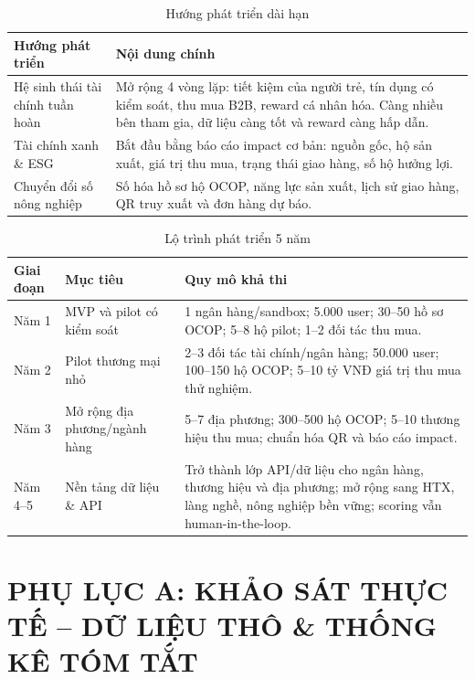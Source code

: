 \documentclass[13pt,a4paper]{extarticle}
\begin{document}
\begin{table}[H]
\centering
\caption{Hướng phát triển dài hạn}
\begin{tabular}{|p{4cm}|p{9cm}|}
\hline
\textbf{Hướng phát triển} & \textbf{Nội dung chính} \\
\hline
Hệ sinh thái tài chính tuần hoàn & Mở rộng 4 vòng lặp: tiết kiệm của người trẻ, tín dụng có kiểm soát, thu mua B2B, reward cá nhân hóa. Càng nhiều bên tham gia, dữ liệu càng tốt và reward càng hấp dẫn. \\
\hline
Tài chính xanh \& ESG & Bắt đầu bằng báo cáo impact cơ bản: nguồn gốc, hộ sản xuất, giá trị thu mua, trạng thái giao hàng, số hộ hưởng lợi. \\
\hline
Chuyển đổi số nông nghiệp & Số hóa hồ sơ hộ OCOP, năng lực sản xuất, lịch sử giao hàng, QR truy xuất và đơn hàng dự báo. \\
\hline
\end{tabular}
\end{table}


\begin{table}[H]
\centering
\caption{Lộ trình phát triển 5 năm}
\begin{tabular}{|p{2cm}|p{4.5cm}|p{7cm}|}
\hline
\textbf{Giai đoạn} & \textbf{Mục tiêu} & \textbf{Quy mô khả thi} \\
\hline
Năm 1 & MVP và pilot có kiểm soát & 1 ngân hàng/sandbox; 5.000 user; 30--50 hồ sơ OCOP; 5--8 hộ pilot; 1--2 đối tác thu mua. \\
\hline
Năm 2 & Pilot thương mại nhỏ & 2--3 đối tác tài chính/ngân hàng; 50.000 user; 100--150 hộ OCOP; 5--10 tỷ VNĐ giá trị thu mua thử nghiệm. \\
\hline
Năm 3 & Mở rộng địa phương/ngành hàng & 5--7 địa phương; 300--500 hộ OCOP; 5--10 thương hiệu thu mua; chuẩn hóa QR và báo cáo impact. \\
\hline
Năm 4--5 & Nền tảng dữ liệu \& API & Trở thành lớp API/dữ liệu cho ngân hàng, thương hiệu và địa phương; mở rộng sang HTX, làng nghề, nông nghiệp bền vững; scoring vẫn human-in-the-loop. \\
\hline
\end{tabular}
\end{table}

\newpage
\section*{PHỤ LỤC A: KHẢO SÁT THỰC TẾ -- DỮ LIỆU THÔ \& THỐNG KÊ TÓM TẮT}
\label{phulucA} 
\end{document}
